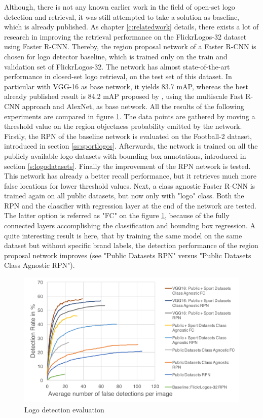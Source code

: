 Although, there is not any known earlier work in the field of open-set logo detection and retrieval, it was still attempted to take a solution as baseline, which is already published. As chapter \ref{c:relatedwork} details, there exists a lot of research in improving the retrieval performance on the FlickrLogos-32 dataset using Faster R-CNN. Thereby, the region proposal network of a Faster R-CNN is chosen for logo detector baseline, which is trained only on the train and validation set of FlickrLogos-32. The network has almost state-of-the-art performance in closed-set logo retrieval, on the test set of this dataset. In particular with VGG-16 as base network, it yields 83.7 mAP, whereas the best already published result is 84.2 mAP proposed by \cite{Bao:2016:RCL:3007669.3007728}, using the multiscale Fast R-CNN approach and AlexNet, as base network.
\bigbreak
All the results of the following experiments are compared in figure \ref{f:detectioneval}. The data points are gathered by moving a threshold value on the region objectness probability emitted by the network.
Firstly, the RPN of the baseline network is evaluated on the Football-2 dataset, introduced in section \ref{ss:sportlogos}. Afterwards, the network is trained on all the publicly available logo datasets with bounding box annotations, introduced in section \ref{s:logodatasets}. Finally the improvement of the RPN network is tested. This network has already a better recall performance, but it retrieves much more false locations for lower threshold values.
Next, a class agnostic Faster R-CNN is trained again on all public datasets, but now only with "logo" class. Both the RPN and the classifier with regression layer at the end of the network are tested. The latter option is referred as "FC" on the figure \ref{f:detectioneval}, because of the fully connected layers accomplishing the classification and bounding box regression. A quite interesting result is here, that by training the same model on the same dataset but without specific brand labels, the detection performance of the region proposal network improves (see "Public Datasets RPN" versus "Public Datasets Class Agnostic RPN").

\begin{figure}
  \centering
  \includegraphics[width=120mm]{images/mt/logodetection.pdf}
  \caption{Logo detection evaluation}
  \label{f:detectioneval}
\end{figure}

